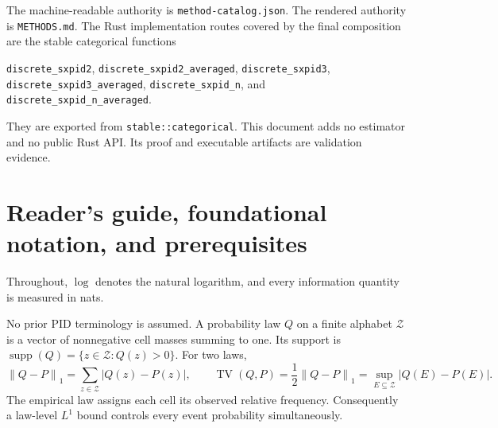 \documentclass[11pt]{article}
\theoremstyle{definition}
\newcommand{\cZ}{\mathcal{Z}}
\newcommand{\supp}{\operatorname{supp}}
\newcommand{\normone}[1]{\left\lVert #1\right\rVert_1}
\begin{document}
The machine-readable authority is \texttt{method-catalog.json}.  The rendered authority is
\texttt{METHODS.md}.  The Rust implementation routes covered by the final composition are the
stable categorical functions
\begin{center}
\nolinkurl{discrete_sxpid2}, \nolinkurl{discrete_sxpid2_averaged},
\nolinkurl{discrete_sxpid3}, \nolinkurl{discrete_sxpid3_averaged},
\nolinkurl{discrete_sxpid_n}, and \nolinkurl{discrete_sxpid_n_averaged}.
\end{center}
They are exported from \nolinkurl{stable::categorical}.  This document adds no estimator and no
public Rust API\@.  Its proof and executable artifacts are validation evidence.

\section*{\leavevmode{} Reader's guide, foundational notation, and prerequisites}

Throughout, $\log$ denotes the natural logarithm, and every information quantity is measured in
nats.

No prior PID terminology is assumed.  A probability law $Q$ on a finite alphabet $\cZ$ is a vector
of nonnegative cell masses summing to one.  Its support is
$\supp(Q)=\{z\in\cZ:Q(z)>0\}$.  For two laws,
\[
  \normone{Q-P}=\sum_{z\in\cZ}|Q(z)-P(z)|,
  \qquad
  \operatorname{TV}(Q,P)=\frac12\normone{Q-P}
  =\sup_{E\subseteq\cZ}|Q(E)-P(E)|.
\]
The empirical law assigns each cell its observed relative frequency.  Consequently a law-level
$L^1$ bound controls every event probability simultaneously.
\end{document}
